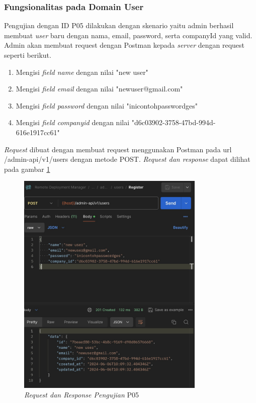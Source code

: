\subsubsection{Fungsionalitas pada Domain User}

Pengujian dengan ID P05 dilakukan dengan skenario yaitu admin berhasil membuat \textit{user} baru dengan nama, email, password, serta companyId yang valid. Admin akan membuat request dengan Postman kepada \textit{server} dengan request seperti berikut.

\begin{enumerate}
  \item Mengisi \textit{field name} dengan nilai "new user"
  \item Mengisi \textit{field email} dengan nilai "newuser@gmail.com"
  \item Mengisi \textit{field password} dengan nilai "inicontohpasswordges"
  \item Mengisi \textit{field company\textunderscore id} dengan nilai "d6c03902-3758-47bd-994d-616e1917cc61"
\end{enumerate}

\textit{Request} dibuat dengan membuat request menggunakan Postman pada url /admin-api/v1/users dengan metode POST. \textit{Request dan response} dapat dilihat pada gambar \ref{fig:pengujian-p05}

\begin{figure}[ht]
  \centering
  \includegraphics[width=0.8\textwidth]{resources/chapter-4/pengujian/p05.jpg}
  \caption{\textit{Request dan Response Pengujian} P05}
  \label{fig:pengujian-p05}
\end{figure}

